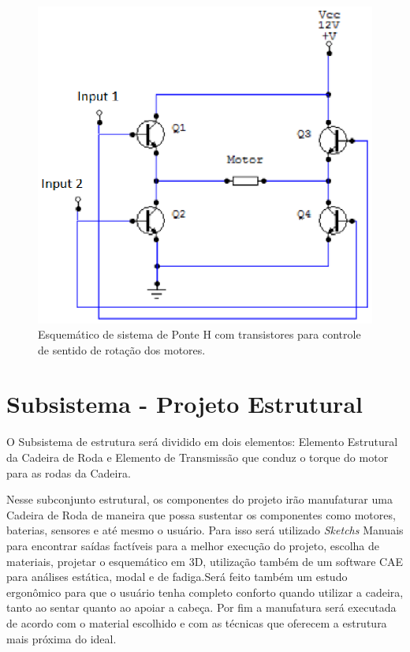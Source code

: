\begin{figure}[H]
  \centering
    \includegraphics[width=\textwidth]{figuras/ponte_h.eps}
  \caption{Esquemático de sistema de Ponte H com transistores para controle de sentido de rotação dos motores.}
  \label{fig:ponte_h}
\end{figure}

\section{Subsistema - Projeto Estrutural}
O Subsistema de estrutura será dividido em dois elementos: 
Elemento Estrutural da Cadeira de Roda e Elemento de Transmissão 
que conduz o torque do motor para as rodas da Cadeira.

Nesse subconjunto estrutural, os componentes do projeto irão 
manufaturar uma Cadeira de Roda de maneira que possa sustentar 
os componentes como motores, baterias, sensores e até mesmo o 
usuário. Para isso será utilizado \textit{Sketchs} Manuais 
para encontrar saídas factíveis para a melhor execução do projeto, 
escolha de materiais, projetar o esquemático em 3D, 
utilização também de um software CAE para análises estática, 
modal e de fadiga.Será feito também um estudo ergonômico 
para que o usuário tenha completo conforto quando utilizar a 
cadeira, tanto ao sentar quanto ao apoiar a cabeça. Por fim a 
manufatura será executada de acordo com o material escolhido 
e com as técnicas que oferecem a estrutura mais próxima do ideal.

